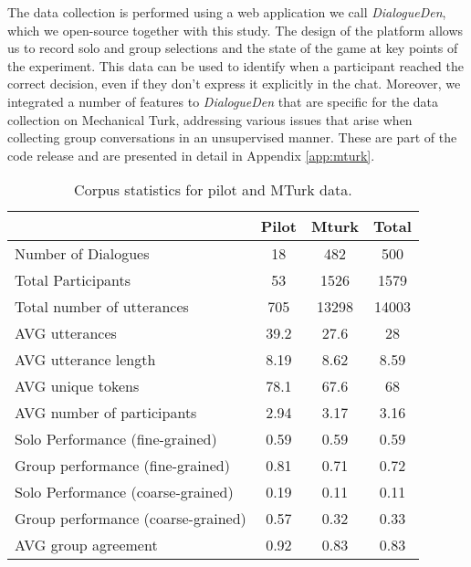 \documentclass[acmsmall,manuscript,screen]{acmart}
\newcommand\newtext[1]{\textcolor{black}{#1}}
\begin{document}
\par
The data collection is performed using a web application we call \textit{DialogueDen}, which we open-source together with this study. The design of the platform allows us to record solo and group selections and the state of the game \newtext{at} key points of the experiment. This data can be used to identify when a participant reached the correct decision, even if they don't express it explicitly in the chat. 
Moreover, we integrated a number of features to \textit{DialogueDen} that are specific for the data collection on Mechanical Turk, addressing various issues that arise when collecting group conversations in an unsupervised manner. These are part of the code release and are presented in detail in Appendix \ref{app:mturk}. \begin{table}[t!]
    \centering
\begin{tabular}{|l|c|c|c|}
    \hline 
    \textbf{} & \textbf{Pilot} & \textbf{Mturk} & \textbf{Total} \\
\hline 
    Number of Dialogues & 18 & 482 & 500 \\ \hline 
    Total Participants & 53 & 1526 & 1579 \\ \hline
Total number of utterances & 705 & 13298 & 14003 \\ \hline
 AVG  utterances 

    & 39.2 & 27.6 &  28  \\ \hline
 
    AVG utterance length & 8.19 & 8.62 & 8.59 \\ \hline
AVG unique tokens 

    & 78.1 & 67.6  & 68  \\ \hline 
AVG number of participants & 2.94 & 3.17 & 3.16 \\ \hline 
     Solo Performance (fine-grained) & 0.59 & 0.59 & 0.59 \\ \hline 
     Group performance (fine-grained) & 0.81 & 0.71 & 0.72 \\ \hline 
     Solo Performance (coarse-grained) & 0.19 & 0.11 & 0.11  \\ \hline
    Group performance (coarse-grained) & 0.57 & 0.32 & 0.33 \\ \hline 
    AVG group agreement & 0.92 & 0.83 & 0.83 \\ \hline 
\end{tabular}
\caption{Corpus statistics for pilot and MTurk data.}
\label{table:initial_data_collection}
\end{table}
\end{document}
